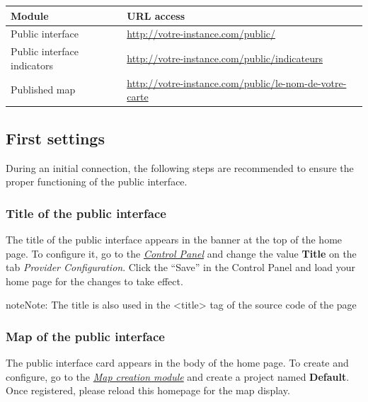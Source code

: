 \documentclass[letterpaper,10pt,english]{sphinxmanual}
\begin{document}
\begin{tabulary}{\linewidth}{|L|L|}
\hline

\textbf{Module}
 & 
\textbf{URL access}
\\
\hline
Public interface
 & 
\href{http://votre-instance.com/public/}{http://votre-instance.com/public/}
\\
\hline
Public interface indicators
 & 
\href{http://votre-instance.com/public/indicateurs}{http://votre-instance.com/public/indicateurs}
\\
\hline
Published map
 & 
\href{http://votre-instance.com/public/le-nom-de-votre-carte}{http://votre-instance.com/public/le-nom-de-votre-carte}
\\
\hline\end{tabulary}



\subsection{First settings}
\label{introduction/usemapmint:premiers-parametrages}
During an initial connection, the following steps are recommended to ensure the proper functioning of the public interface.


\subsubsection{Title of the public interface}
\label{introduction/usemapmint:titre-de-l-interface-publique}
The title of the public interface appears in the banner at the top of the home page. To configure it, go to the {\hyperref[dashboard/configuration::doc]{\emph{\emph{Control Panel}}}} and change the value \textbf{Title} on the tab \emph{Provider Configuration}. Click the ``Save'' in the Control Panel and load your home page for the changes to take effect.

\begin{notice}{note}{Note:}
The title is also used in the \textless{}title\textgreater{} tag of the source code of the page
\end{notice}


\subsubsection{Map of the public interface}
\label{introduction/usemapmint:carte-de-l-interface-publique}
The public interface card appears in the body of the home page. To create and configure, go to the {\hyperref[maps/index::doc]{\emph{\emph{Map creation module}}}} and create a project named \textbf{Default}. Once registered, please reload this homepage for the map display.
\end{document}
